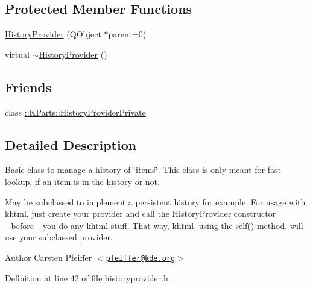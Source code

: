 \subsection*{\-Protected \-Member \-Functions}
\begin{DoxyCompactItemize}
\item 
\hyperlink{classKParts_1_1HistoryProvider_a6b074dce67d7c90e6c795ef961272674}{\-History\-Provider} (\-Q\-Object $\ast$parent=0)
\item 
virtual \hyperlink{classKParts_1_1HistoryProvider_ad1c5d49be5dd48a6fd6776b55afa13d9}{$\sim$\-History\-Provider} ()
\end{DoxyCompactItemize}
\subsection*{\-Friends}
\begin{DoxyCompactItemize}
\item 
class \hyperlink{classKParts_1_1HistoryProvider_aa6bf68e5e8d7a54d38811147d3243489}{\-::\-K\-Parts\-::\-History\-Provider\-Private}
\end{DoxyCompactItemize}


\subsection{\-Detailed \-Description}
\-Basic class to manage a history of \char`\"{}items\char`\"{}. \-This class is only meant for fast lookup, if an item is in the history or not.

\-May be subclassed to implement a persistent history for example. \-For usage with khtml, just create your provider and call the \hyperlink{classKParts_1_1HistoryProvider}{\-History\-Provider} constructor \-\_\-before\-\_\- you do any khtml stuff. \-That way, khtml, using the \hyperlink{classKParts_1_1HistoryProvider_a3c2fe96b915ebe5e310bbcbd8499002d}{self()}-\/method, will use your subclassed provider.

\begin{DoxyAuthor}{\-Author}
\-Carsten \-Pfeiffer $<$\href{mailto:pfeiffer@kde.org}{\tt pfeiffer@kde.\-org}$>$ 
\end{DoxyAuthor}


\-Definition at line 42 of file historyprovider.\-h.



